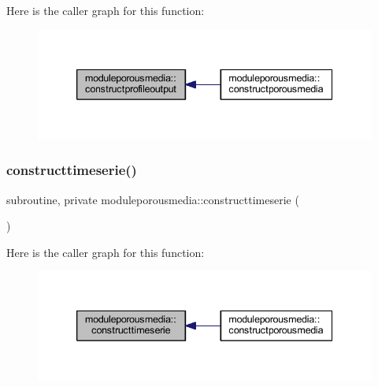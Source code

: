 Here is the caller graph for this function\+:\nopagebreak
\begin{figure}[H]
\begin{center}
\leavevmode
\includegraphics[width=339pt]{namespacemoduleporousmedia_a4c55632f6a1d6b5ff5769ca1ae4a1f74_icgraph}
\end{center}
\end{figure}
\mbox{\label{namespacemoduleporousmedia_adba23be00c82f6436627807a223113c5}} 
\subsubsection{\texorpdfstring{constructtimeserie()}{constructtimeserie()}}
{\footnotesize\ttfamily subroutine, private moduleporousmedia\+::constructtimeserie (\begin{DoxyParamCaption}{ }\end{DoxyParamCaption})\hspace{0.3cm}{\ttfamily [private]}}

Here is the caller graph for this function\+:\nopagebreak
\begin{figure}[H]
\begin{center}
\leavevmode
\includegraphics[width=339pt]{namespacemoduleporousmedia_adba23be00c82f6436627807a223113c5_icgraph}
\end{center}
\end{figure}
\mbox{\label{namespacemoduleporousmedia_ad5fbeb4f9729104026e34d772e57be70}} 
